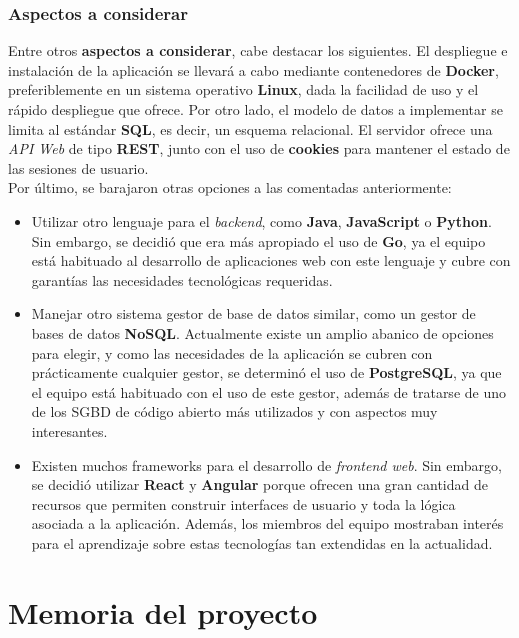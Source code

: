 \documentclass[11pt, a4paper, titlepage]{article}
\begin{document}
\subsubsection{Aspectos a considerar}

Entre otros \textbf{aspectos a considerar}, cabe destacar los siguientes. El despliegue e instalación de la aplicación se llevará a cabo mediante contenedores de \textbf{Docker}, preferiblemente en un sistema operativo \textbf{Linux}, dada la facilidad de uso y el rápido despliegue que ofrece. Por otro lado, el modelo de datos a implementar se limita al estándar \textbf{SQL}, es decir, un esquema relacional. El servidor ofrece una \textit{API Web} de tipo \textbf{REST}, junto con el uso de \textbf{cookies} para mantener el estado de las sesiones de usuario. \\

Por último, se barajaron otras opciones a las comentadas anteriormente:

\begin{itemize}
    \item Utilizar otro lenguaje para el \textit{backend}, como \textbf{Java}, \textbf{JavaScript} o \textbf{Python}. Sin embargo, se decidió que era más apropiado el uso de \textbf{Go}, ya el equipo está habituado al desarrollo de aplicaciones web con este lenguaje y cubre con garantías las necesidades tecnológicas requeridas.

    \item  Manejar otro sistema gestor de base de datos similar, como un gestor de bases de datos \textbf{NoSQL}. Actualmente existe un amplio abanico de opciones para elegir, y como las necesidades de la aplicación se cubren con prácticamente cualquier gestor, se determinó el uso de \textbf{PostgreSQL}, ya que el equipo está habituado con el uso de este gestor, además de tratarse de uno de los SGBD de código abierto más utilizados y con aspectos muy interesantes.

    \item Existen muchos frameworks para el desarrollo de \textit{frontend web}. Sin embargo, se decidió utilizar  \textbf{React} y \textbf{Angular} porque ofrecen una gran cantidad de recursos que permiten construir interfaces de usuario y toda la lógica asociada a la aplicación. Además, los miembros del equipo mostraban interés para el aprendizaje sobre estas tecnologías tan extendidas en la actualidad.
\end{itemize}

\section{Memoria del proyecto}
\end{document}
